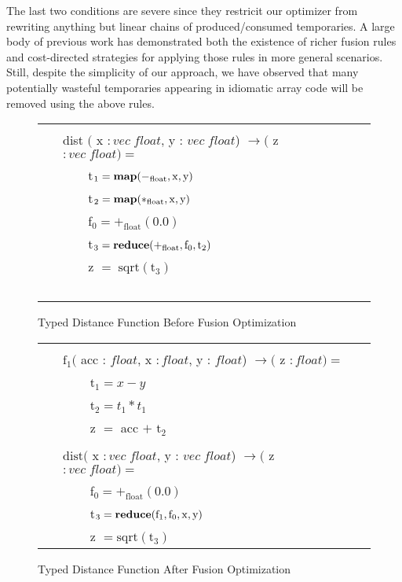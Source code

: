 \documentclass[preprint]{sigplanconf}
\begin{document}
The last two conditions are severe since they restricit our optimizer from rewriting anything but linear chains of produced/consumed temporaries. A large body of previous work\cite{Ald01} has demonstrated  both the existence of richer fusion rules and cost-directed strategies for applying those rules in more general scenarios. Still, despite the simplicity of our approach, we have observed that many potentially wasteful temporaries appearing in idiomatic array code will be removed using the above rules. 
\\[5pt]
\begin{figure}[h!]
\begin{tabular}{| m{0.0001cm} m{0.1cm} m{6.7cm} m{0.001cm} | }
 \hline
  & & & \\ 
  & \multicolumn{2}{l}{dist $($ x $ : vec \; float $, y : $ vec \; float $) $ \rightarrow  ($ z $ :  vec \; float ) =$} & \\
  & & t$_1   = \mbox{\textbf{map}} ( -_{\mathrm{float}}, \mathrm{x}, \mathrm{y})$        & \\
  & & t$_2   = \mbox{\textbf{map}} (*_{\mathrm{float}}, \mathrm{x}, \mathrm{y})$             & \\
  & & f$_0  = +_{\mathrm{float}}(0.0)$   & \\
  & & t$_3 = \mbox{\textbf{reduce}} (+_{\mathrm{float}}, \mathrm{f_0}, \mathrm{t}_2)$   & \\\
  & & z $  = \; \mathrm{sqrt}(\mathrm{t}_3)$                                                         & \\\
  & & & \\ 
 \hline
\end{tabular}
\caption{Typed Distance Function Before Fusion Optimization}
\end{figure}

\begin{figure}[h!]
\begin{tabular}{| m{0.0001cm} m{0.1cm} m{6.7cm} m{0.001cm} | }
 \hline
  & & & \\
  & \multicolumn{2}{l}{$\mathrm{f}_1 ($ acc : $ float $,  x $ : float $, y : $ float $) $ \rightarrow  ($ z $ :  float ) =$} & \\
  & & t$_1 = x - y $        & \\
  & & t$_2  = t_1 * t_1 $      & \\
  & & z $ = $ acc $+$ t$_2$    & \\
  & & & \\ 
  & \multicolumn{2}{l}{$\mathrm{dist} ($ x $ : vec \; float $, y : $ vec \; float $) $ \rightarrow  ($ z $ :  vec \; float ) =$} & \\
  & & f$_0 = +_{\mathrm{float}}(0.0)$   & \\
  & & t$_3 = \mbox{\textbf{reduce}} (\mathrm{f}_1, \mathrm{f_0}, \mathrm{x}, \mathrm{y})$   & \\\
  & & z $ = \mathrm{sqrt}(\mathrm{t}_3)$    \\
 \hline
\end{tabular}
\caption{Typed Distance Function After Fusion Optimization}
\end{figure}
\end{document}
